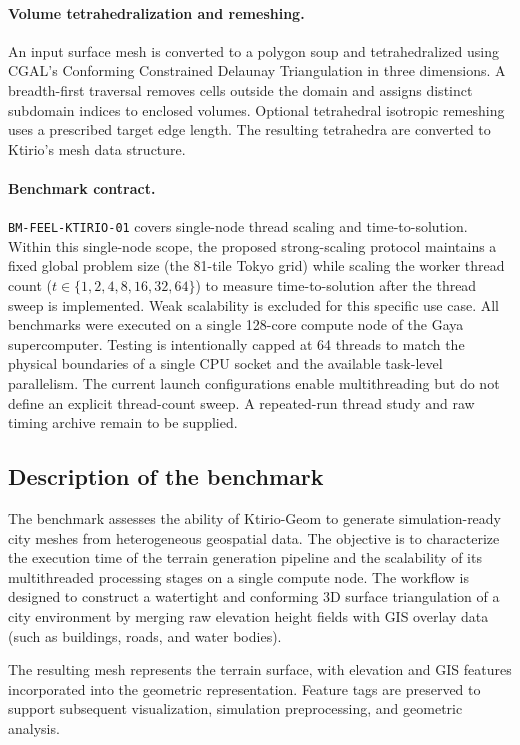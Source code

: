 \paragraph{Volume tetrahedralization and remeshing.}
An input surface mesh is converted to a polygon soup and tetrahedralized
using CGAL's Conforming Constrained Delaunay Triangulation in three dimensions.
A breadth-first traversal removes cells outside the domain and assigns
distinct subdomain indices to enclosed volumes. Optional tetrahedral
isotropic remeshing uses a prescribed target edge length. The resulting
tetrahedra are converted to Ktirio's mesh data structure.

\paragraph{Benchmark contract.}
\texttt{BM-FEEL-KTIRIO-01} covers single-node thread scaling and time-to-solution.
Within this single-node scope, the proposed strong-scaling protocol maintains a fixed global problem size (the 81-tile Tokyo grid) while scaling the worker thread count ($t \in \{1, 2, 4, 8, 16, 32, 64\}$) to measure time-to-solution after the thread sweep is implemented.
Weak scalability is excluded for this specific use case.
All benchmarks were executed on a single 128-core compute node of the Gaya supercomputer.
Testing is intentionally capped at 64 threads to match the physical boundaries of a single CPU socket and the available task-level parallelism.
The current launch configurations enable multithreading but do not define an explicit thread-count sweep. A repeated-run thread study and raw timing archive remain to be supplied.


\subsection{Description of the benchmark}

The benchmark assesses the ability of Ktirio-Geom to generate simulation-ready city meshes from heterogeneous geospatial data.
The objective is to characterize the execution time of the terrain generation pipeline and the scalability of its multithreaded processing stages on a single compute node.
The workflow is designed to construct a watertight and conforming 3D surface triangulation of a city environment by merging raw elevation height fields with GIS overlay data (such as buildings, roads, and water bodies).

The resulting mesh represents the terrain surface, with elevation and GIS features incorporated into the geometric representation.
Feature tags are preserved to support subsequent visualization, simulation preprocessing, and geometric analysis.



